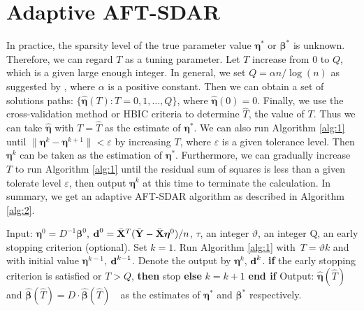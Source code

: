 \documentclass[12pt]{article}
\newcommand{\bX}{{\bf X}}
\newcommand{\bd}{\mbox{\bf d}}
\newcommand{\bY}{\mbox{\bf Y}}
\newcommand{\bbeta}{\boldsymbol{\beta}}
\newcommand{\boldeta}{\boldsymbol{\eta}}
\begin{document}
\section{Adaptive AFT-SDAR}
\label{sec:5}
In practice, the sparsity level of the true parameter value $\boldeta^*$ or $\bbeta^*$ is unknown. Therefore, we can regard $T$ as a tuning parameter.
Let $T$ increase from 0 to $Q$, which is a given large enough integer. In general, we set $Q=\alpha n/\log(n)$ as suggested by
\cite{fan2008sure},
where $\alpha$ is a positive constant.
Then we can obtain a set of solutions paths: $\{\widehat{\boldeta}(T):T=0,1,\ldots,Q\}$, where $\widehat{\boldeta}(0)=0$. Finally, we use the cross-validation method or HBIC criteria
\citep{wang2013calibrating}
to determine $\widehat{T}$,  the value of $T$. Thus we can take $\widehat{\boldeta}$ with $T=\widehat{T}$ as the estimate of $\boldeta^{*}$.
We can  also run Algorithm  \ref{alg:1} until $\|\boldeta^k-\boldeta^{k + 1}\|<\varepsilon$ by increasing $T$, where $\varepsilon$ is a given tolerance level. Then $\boldeta^k$ can be taken as the estimation of $\boldeta^*$.
Furthermore, we can gradually increase $T$ to run Algorithm \ref{alg:1} until the residual sum of squares is less than a given tolerate level $\varepsilon$, then  output $\boldeta^k$ at this time to terminate the calculation. In summary, we get an adaptive AFT-SDAR algorithm as described in Algorithm \ref{alg:2}.
\begin{algorithm}[!ht]
\caption{AFT-ASDAR}
\label{alg:2}
\begin{algorithmic}[1]
\STATE Input: $\boldeta^0=D^{-1}\bbeta^0$, $\bd^0=\bar{\bX}^T(\bar{\bY}-\bar{\bX}\boldeta^0)/n$, $\tau$, an integer $\vartheta$, an integer Q, an early stopping criterion (optional). Set $k=1$.
\STATE Run Algorithm \ref{alg:1} with~$T=\vartheta k$ and with initial value $\boldeta^{k-1}$, $\bd^{k-1}$. Denote the output  by $\boldeta^k$, $\bd^k$.
\STATE \textbf{if} the early stopping criterion is satisfied or $T>Q$,
\textbf{then}
\STATE \quad stop
\STATE \textbf{else}
\STATE \quad $k=k+1$
\STATE \textbf{end if}
\ENDFOR
\STATE Output: $\widehat{\boldeta}(\widehat{T})$ and $\widehat{\bbeta}(\widehat{T})=D\cdot\widehat{\bbeta}(\widehat{T})$~~as the estimates of $\boldeta^*$ and $\bbeta^*$ respectively.
\end{algorithmic}
\end{algorithm}
\end{document}
